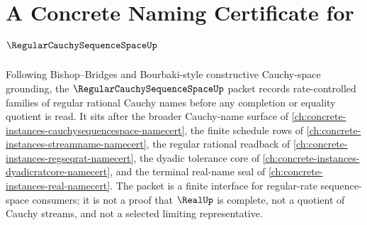 \chapter{A Concrete Naming Certificate for $\RegularCauchySequenceSpaceUp$}
\label{ch:concrete-instances-regular-cauchy-sequence-space-namecert}

Following Bishop--Bridges and Bourbaki-style constructive Cauchy-space grounding, the $\RegularCauchySequenceSpaceUp$ packet records rate-controlled families of regular rational Cauchy names before any completion or equality quotient is read. It sits after the broader Cauchy-name surface of \autoref{ch:concrete-instances-cauchysequencespace-namecert}, the finite schedule rows of \autoref{ch:concrete-instances-streamname-namecert}, the regular rational readback of \autoref{ch:concrete-instances-regseqrat-namecert}, the dyadic tolerance core of \autoref{ch:concrete-instances-dyadicratcore-namecert}, and the terminal real-name seal of \autoref{ch:concrete-instances-real-namecert}. The packet is a finite interface for regular-rate sequence-space consumers; it is not a proof that $\RealUp$ is complete, not a quotient of Cauchy streams, and not a selected limiting representative.

